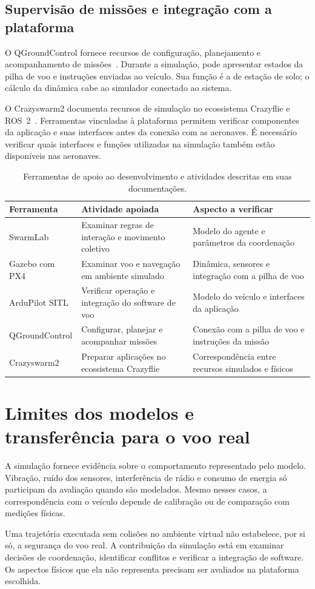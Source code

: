 \subsection{Supervisão de missões e integração com a plataforma}
O QGroundControl fornece recursos de configuração, planejamento e acompanhamento de missões~\cite{qgc}. Durante a simulação, pode apresentar estados da pilha de voo e instruções enviadas ao veículo. Sua função é a de estação de solo; o cálculo da dinâmica cabe ao simulador conectado ao sistema.

O Crazyswarm2 documenta recursos de simulação no ecossistema Crazyflie e ROS~2~\cite{crazyswarm2}. Ferramentas vinculadas à plataforma permitem verificar componentes da aplicação e suas interfaces antes da conexão com as aeronaves. É necessário verificar quais interfaces e funções utilizadas na simulação também estão disponíveis nas aeronaves.

\begin{table}[htbp]
\centering\small
\caption{Ferramentas de apoio ao desenvolvimento e atividades descritas em suas documentações.}
\label{tab:simuladores}
\begin{tabularx}{\textwidth}{@{}>{\raggedright\arraybackslash}p{3cm}YY@{}}
\toprule
Ferramenta & Atividade apoiada & Aspecto a verificar \\
\midrule
SwarmLab & Examinar regras de interação e movimento coletivo & Modelo do agente e parâmetros da coordenação \\
Gazebo com PX4 & Examinar voo e navegação em ambiente simulado & Dinâmica, sensores e integração com a pilha de voo \\
ArduPilot SITL & Verificar operação e integração do software de voo & Modelo do veículo e interfaces da aplicação \\
QGroundControl & Configurar, planejar e acompanhar missões & Conexão com a pilha de voo e instruções da missão \\
Crazyswarm2 & Preparar aplicações no ecossistema Crazyflie & Correspondência entre recursos simulados e físicos \\
\bottomrule
\end{tabularx}
\end{table}

\section{Limites dos modelos e transferência para o voo real}\label{sec:limites-sim}
A simulação fornece evidência sobre o comportamento representado pelo modelo. Vibração, ruído dos sensores, interferência de rádio e consumo de energia só participam da avaliação quando são modelados. Mesmo nesses casos, a correspondência com o veículo depende de calibração ou de comparação com medições físicas.

Uma trajetória executada sem colisões no ambiente virtual não estabelece, por si só, a segurança do voo real. A contribuição da simulação está em examinar decisões de coordenação, identificar conflitos e verificar a integração de software. Os aspectos físicos que ela não representa precisam ser avaliados na plataforma escolhida.
